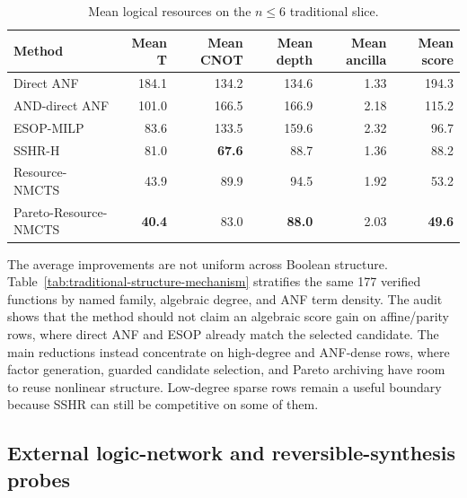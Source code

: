 \documentclass[11pt]{article}
\newcommand{\method}{Resource-NMCTS}
\begin{document}
\begin{table}[H]
\centering
\small
\caption{Mean logical resources on the $n\leq6$ traditional slice.}
\label{tab:traditional}
\begin{tabular}{lrrrrr}
\toprule
Method & Mean T & Mean CNOT & Mean depth & Mean ancilla & Mean score \\
\midrule
Direct ANF & 184.1 & 134.2 & 134.6 & 1.33 & 194.3 \\
AND-direct ANF & 101.0 & 166.5 & 166.9 & 2.18 & 115.2 \\
ESOP-MILP & 83.6 & 133.5 & 159.6 & 2.32 & 96.7 \\
SSHR-H & 81.0 & \textbf{67.6} & 88.7 & 1.36 & 88.2 \\
\method{} & 43.9 & 89.9 & 94.5 & 1.92 & 53.2 \\
Pareto-\method{} & \textbf{40.4} & 83.0 & \textbf{88.0} & 2.03 & \textbf{49.6} \\
\bottomrule
\end{tabular}
\end{table}

The average improvements are not uniform across Boolean structure.
Table~\ref{tab:traditional-structure-mechanism} stratifies the same 177
verified functions by named family, algebraic degree, and ANF term density.
The audit shows that the method should not claim an algebraic score gain on
affine/parity rows, where direct ANF and ESOP already match the selected
candidate.  The main reductions instead concentrate on high-degree and
ANF-dense rows, where factor generation, guarded candidate selection, and
Pareto archiving have room to reuse nonlinear structure.  Low-degree sparse
rows remain a useful boundary because SSHR can still be competitive on some of
them.

\begin{table}[H]
\centering
\scriptsize
\setlength{\tabcolsep}{2pt}
\renewcommand{\arraystretch}{1.04}
\caption{Traditional-slice structure mechanism audit.  Rows report paired score
win/loss/tie counts and mean relative score changes for Pareto-\method{} within
structural buckets of the same verified $n\leq6$ functions.}
\label{tab:traditional-structure-mechanism}

\end{table}

\subsection{External logic-network and reversible-synthesis probes}
\end{document}
